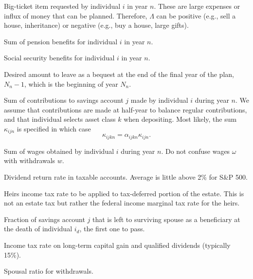 \documentclass{article}[fleqn,12pt]
\begin{document}
\begin{description}[leftmargin=4em,style=multiline]
\item [$\Lambda_{in}$]
	Big-ticket item requested by individual $i$ in year $n$.
	These are large expenses or influx of money
	that can be planned. Therefore, $\Lambda$ can be positive (e.g., sell a house, inheritance)
	or negative (e.g., buy a house, large gifts).
\item [$\pi_{in}$]
	Sum of pension benefits for individual $i$ in year $n$.
\item [$\zeta_{in}$]
	Social security benefits for individual $i$ in year $n$.
\item [$\epsilon_{N_n}$]
	Desired amount to leave as a bequest at the end of the final year of the plan, $N_n-1$,
	which is the beginning of year $N_n$.
\item [$\kappa_{ijkn}$]
	Sum of contributions to savings account $j$ made by individual $i$ during year $n$.
	We assume that contributions are made at half-year to balance regular contributions,
	and that individual selects asset class $k$ when depositing. Most likely, the sum
	$\kappa_{ijn}$ is specified in which case 
	\begin{equation}
		\kappa_{ijkn} = \alpha_{ijkn}\kappa_{ijn}.
	\end{equation}
\item [$\omega_{in}$]
	Sum of wages obtained by individual $i$ during year $n$.
	Do not confuse wages $\omega$ with withdrawals $w$.
\item [$\mu$]
	Dividend return rate in taxable accounts. Average is little above 2\% for S\&P 500.
\item [$\nu$]
	Heirs income tax rate to be applied to tax-deferred portion of the estate. This is not an estate tax
	but rather the federal income marginal tax rate for the heirs.
\item [$\phi_j$]
	Fraction of savings account $j$ that is left to surviving spouse as a beneficiary
	at the death of individual $i_d$, the first one to pass.
\item [$\psi$]
	Income tax rate on long-term capital gain and qualified dividends (typically 15\%).
\item [$\eta$]
	Spousal ratio for withdrawals.
\end{description}
\end{document}

